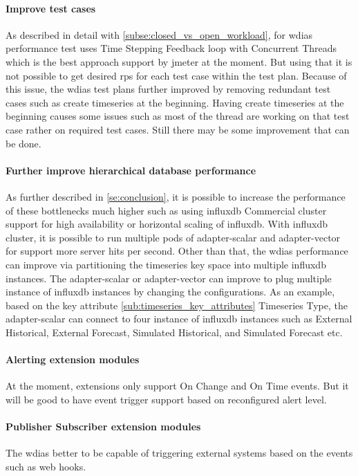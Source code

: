\paragraph{Improve test cases}
As described in detail with \ref{subse:closed_vs_open_workload}, for \acrshort{wdias} performance test uses Time Stepping Feedback loop with Concurrent Threads which is the best approach support by \acrshort{jmeter} at the moment. But using that it is not possible to get desired \acrshort{rps} for each test case within the test plan.
Because of this issue, the \acrshort{wdias} test plans further improved by removing redundant test cases such as create timeseries at the beginning. Having create timeseries at the beginning causes some issues such as most of the thread are working on that test case rather on required test cases. Still there may be some improvement that can be done. 

\paragraph{Further improve hierarchical database performance}
As further described in \ref{se:conclusion}, it is possible to increase the performance of these bottlenecks much higher such as using \acrshort{influxdb} Commercial cluster support for high availability or horizontal scaling of \acrshort{influxdb}. With \acrshort{influxdb} cluster, it is possible to run multiple pods of adapter-scalar and adapter-vector for support more server hits per second.
Other than that, the \acrshort{wdias} performance can improve via partitioning the timeseries key space into multiple \acrshort{influxdb} instances. The adapter-scalar or adapter-vector can improve to plug multiple instance of \acrshort{influxdb} instances by changing the configurations. As an example, based on the key attribute \ref{sub:timeseries_key_attributes} Timeseries Type, the adapter-scalar can connect to four instance of \acrshort{influxdb} instances such as  External Historical, External Forecast, Simulated Historical, and Simulated Forecast etc.

\paragraph{Alerting extension modules}
At the moment, extensions only support On Change and On Time events. But it will be good to have event trigger support based on reconfigured alert level.

\paragraph{Publisher Subscriber extension modules}
The \acrshort{wdias} better to be capable of triggering external systems based on the events such as web hooks.
